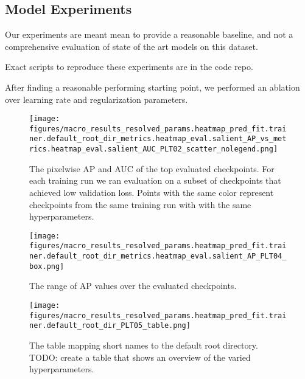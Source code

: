 \documentclass[10pt,twocolumn,letterpaper]{article}
\begin{document}
\subsection{Model Experiments}

\begin{comment}
    SeeAlso:
    ~/code/shitspotter/experiments/run_pixel_eval_pipeline.sh

    python ~/code/shitspotter/dev/poc/estimate_train_resources.py

\end{comment}

Our experiments are meant mean to provide a reasonable baseline, and not a
comprehensive evaluation of state of the art models on this dataset.

Exact scripts to reproduce these experiments are in the code repo.

After finding a reasonable performing starting point, we performed an ablation
over learning rate and regularization parameters. 
\begin{figure}[h]
\centering

\texttt{[image: figures/macro\_results\_resolved\_params.heatmap\_pred\_fit.trainer.default\_root\_dir\_metrics.heatmap\_eval.salient\_AP\_vs\_metrics.heatmap\_eval.salient\_AUC\_PLT02\_scatter\_nolegend.png]}
\caption[]{
    The pixelwise AP and AUC of the top evaluated checkpoints.
    For each training run we ran evaluation on a subset of checkpoints that
    achieved low validation loss.
    Points with the same color represent checkpoints from the same training run
    with with the same hyperparameters.
}
\label{fig:apauc_scatter}
\end{figure}


\begin{figure}[h]
\centering
\texttt{[image: figures/macro\_results\_resolved\_params.heatmap\_pred\_fit.trainer.default\_root\_dir\_metrics.heatmap\_eval.salient\_AP\_PLT04\_box.png]}
\caption{
    The range of AP values over the evaluated checkpoints.
}
\label{fig:ap_boxplot}
\end{figure}


\begin{figure}[h]
\centering
\texttt{[image: figures/macro\_results\_resolved\_params.heatmap\_pred\_fit.trainer.default\_root\_dir\_PLT05\_table.png]}
\caption{
    The table mapping short names to the default root directory.
    TODO: create a table that shows an overview of the varied hyperparameters.
}
\label{fig:scatter_legend}
\end{figure}
\end{document}
